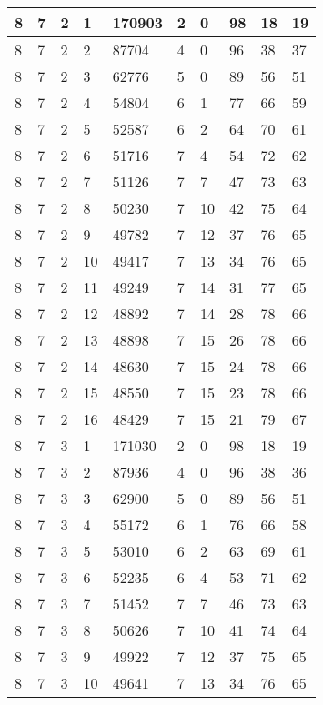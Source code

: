\begin{table}[!ht]
\begin{tabular}{|l|l|l|l|l|l|l|l|l|l|}
        8 & 7 & 2 & 1 & 170903 & 2 & 0 & 98 & 18 & 19 \\ \hline
        8 & 7 & 2 & 2 & 87704 & 4 & 0 & 96 & 38 & 37 \\ \hline
        8 & 7 & 2 & 3 & 62776 & 5 & 0 & 89 & 56 & 51 \\ \hline
        8 & 7 & 2 & 4 & 54804 & 6 & 1 & 77 & 66 & 59 \\ \hline
        8 & 7 & 2 & 5 & 52587 & 6 & 2 & 64 & 70 & 61 \\ \hline
        8 & 7 & 2 & 6 & 51716 & 7 & 4 & 54 & 72 & 62 \\ \hline
        8 & 7 & 2 & 7 & 51126 & 7 & 7 & 47 & 73 & 63 \\ \hline
        8 & 7 & 2 & 8 & 50230 & 7 & 10 & 42 & 75 & 64 \\ \hline
        8 & 7 & 2 & 9 & 49782 & 7 & 12 & 37 & 76 & 65 \\ \hline
        8 & 7 & 2 & 10 & 49417 & 7 & 13 & 34 & 76 & 65 \\ \hline
        8 & 7 & 2 & 11 & 49249 & 7 & 14 & 31 & 77 & 65 \\ \hline
        8 & 7 & 2 & 12 & 48892 & 7 & 14 & 28 & 78 & 66 \\ \hline
        8 & 7 & 2 & 13 & 48898 & 7 & 15 & 26 & 78 & 66 \\ \hline
        8 & 7 & 2 & 14 & 48630 & 7 & 15 & 24 & 78 & 66 \\ \hline
        8 & 7 & 2 & 15 & 48550 & 7 & 15 & 23 & 78 & 66 \\ \hline
        8 & 7 & 2 & 16 & 48429 & 7 & 15 & 21 & 79 & 67 \\ \hline
        8 & 7 & 3 & 1 & 171030 & 2 & 0 & 98 & 18 & 19 \\ \hline
        8 & 7 & 3 & 2 & 87936 & 4 & 0 & 96 & 38 & 36 \\ \hline
        8 & 7 & 3 & 3 & 62900 & 5 & 0 & 89 & 56 & 51 \\ \hline
        8 & 7 & 3 & 4 & 55172 & 6 & 1 & 76 & 66 & 58 \\ \hline
        8 & 7 & 3 & 5 & 53010 & 6 & 2 & 63 & 69 & 61 \\ \hline
        8 & 7 & 3 & 6 & 52235 & 6 & 4 & 53 & 71 & 62 \\ \hline
        8 & 7 & 3 & 7 & 51452 & 7 & 7 & 46 & 73 & 63 \\ \hline
        8 & 7 & 3 & 8 & 50626 & 7 & 10 & 41 & 74 & 64 \\ \hline
        8 & 7 & 3 & 9 & 49922 & 7 & 12 & 37 & 75 & 65 \\ \hline
        8 & 7 & 3 & 10 & 49641 & 7 & 13 & 34 & 76 & 65 \\ \hline

\end{tabular}
\end{table}
